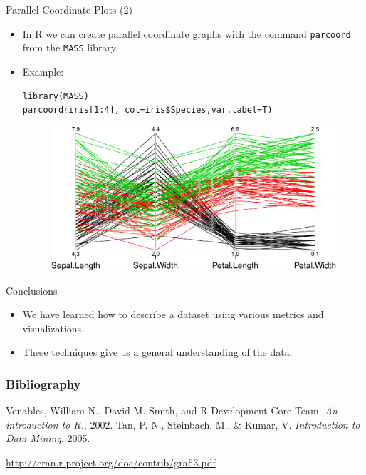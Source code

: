 \documentclass[handout]{beamer}
\begin{document}
\begin{frame}[fragile]{Parallel Coordinate Plots (2)}
\scriptsize{
 \begin{itemize}
  \item  In R we can create parallel coordinate graphs with the command \verb+parcoord+ from the \verb+MASS+ library.
  \item Example:
  \begin{verbatim}
library(MASS)
parcoord(iris[1:4], col=iris$Species,var.label=T)   
  \end{verbatim}
  
  \begin{figure}[h!]
	\centering
	\includegraphics[scale=0.5]{pics/parallel.pdf}		
\end{figure}   

 \end{itemize} 
 
 }  
\end{frame}

\begin{frame}[fragile]{Conclusions}
\scriptsize{
 \begin{itemize}
  \item We have learned how to describe a dataset using various metrics and visualizations.
  \item These techniques give us a general understanding of the data.  
 \end{itemize} 
 
 }  
\end{frame}




\begin{frame}[allowframebreaks]\scriptsize
\frametitle{Bibliography}
%
%
\begin{thebibliography}{8}

Venables, William N., David M. Smith, and R Development Core Team. \emph{An introduction to R.}, 2002.
Tan, P. N., Steinbach, M., \& Kumar, V. \emph{Introduction to Data Mining}, 2005.

\url{http://cran.r-project.org/doc/contrib/grafi3.pdf}
\end{thebibliography}


%
\end{frame}










\end{document}
